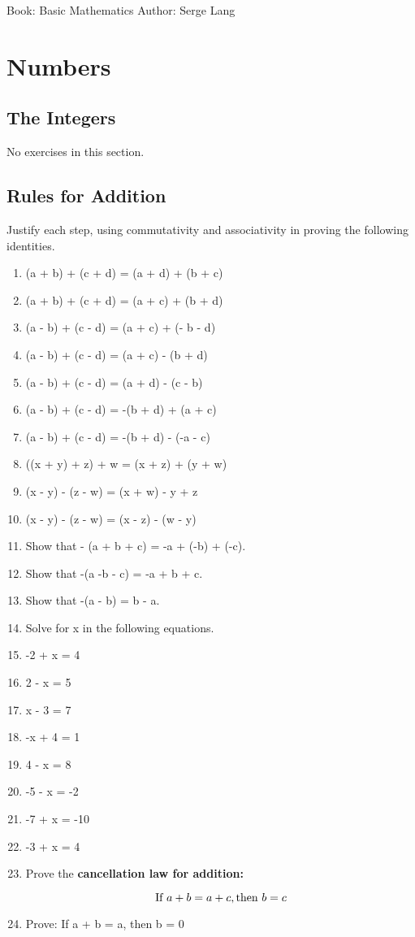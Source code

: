 \documentclass{report}
\def\MLine#1{\par\hspace*{-\leftmargin}\parbox{\textwidth}{\[#1\]}}
\begin{document}
Book: Basic Mathematics
Author: Serge Lang

\tableofcontents{}

\chapter{Numbers}

\section{The Integers}
No exercises in this section.

\section{Rules for Addition}
Justify each step, using commutativity and associativity in proving the following identities.

\begin{enumerate}
    \item (a + b) + (c + d) = (a + d) + (b + c)
    \item (a + b) + (c + d) = (a + c) + (b + d)
    \item (a - b) + (c - d) = (a + c) + (- b - d)
    \item (a - b) + (c - d) = (a + c) - (b + d)
    \item (a - b) + (c - d) = (a + d) - (c - b)
    \item (a - b) + (c - d) = -(b + d) + (a + c)
    \item (a - b) + (c - d) = -(b + d) - (-a - c)
    \item ((x + y) + z) + w = (x + z) + (y + w)
    \item (x - y) - (z - w) = (x + w) - y + z
    \item (x - y) - (z - w) = (x - z) - (w - y)
    \item Show that - (a + b + c) = -a + (-b) + (-c).
    \item Show that -(a -b - c) = -a + b + c.
    \item Show that -(a - b) = b - a.
    \item[] Solve for x in the following equations.
    \item -2 + x = 4
    \item 2 - x = 5
    \item x - 3 = 7
    \item -x + 4 = 1
    \item 4 - x = 8
    \item -5 - x = -2
    \item -7 + x = -10
    \item -3 + x = 4
    \item Prove the \textbf{cancellation law for addition:}
	    \MLine{\textnormal{If } a + b = a + c, \textnormal{then } b = c}
    \item Prove: If a + b = a, then b = 0
\end{enumerate}
\end{document}
